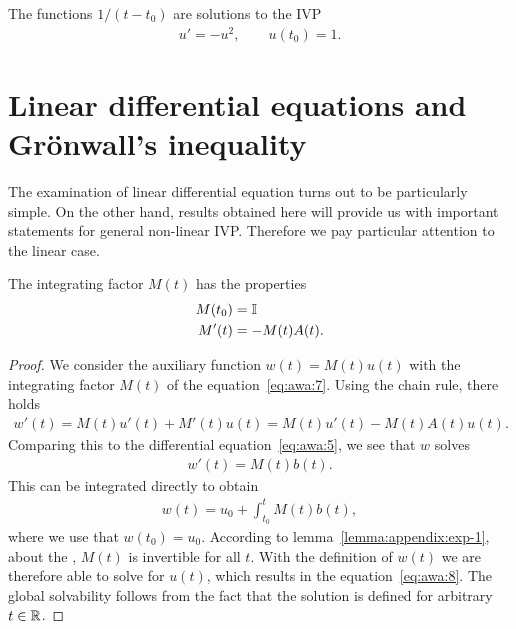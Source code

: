\begin{example}
  The functions $1/(t-t_0)$ are solutions to the IVP
  \begin{gather*}
    u'=-u^2, \qquad u(t_0) = 1.
  \end{gather*}
\end{example}

\section{Linear differential equations
  and Grönwall's inequality}

\begin{intro}
  The examination of linear differential equation turns out to be
  particularly simple. On the other hand, results obtained here will
  provide us with important statements for general non-linear
  IVP. Therefore we pay particular attention to the linear case.
\end{intro}




\begin{corollary}
  The integrating factor $M(t)$ has the properties
  \begin{align}
    \label{eq:awa:14}
    M(t_0) &= \mathbb I\\
    \label{eq:awa:15}
    M'(t) &= -M(t)A(t).
  \end{align}
\end{corollary}



\begin{proof}
  We consider the auxiliary function $w(t) = M(t) u(t)$ with the
  integrating factor $M(t)$ of the equation~\eqref{eq:awa:7}. Using the
  chain rule, there holds
  \begin{gather}
    \label{eq:awa:19}
    w'(t) =  M(t) u'(t) + M'(t) u(t)
    =  M(t) u'(t) - M(t)A(t)u(t).
  \end{gather}
  Comparing this to the differential equation~\eqref{eq:awa:5}, we see
  that $w$ solves
  \begin{gather*}
    w'(t) = M(t) b(t).
  \end{gather*}
	This can be integrated directly to obtain	
  \begin{gather*}
    w(t) = u_0 + \int_{t_0}^t M(t) b(t),
  \end{gather*}
  where we use that $w(t_0) = u_0$.  According to
  lemma~\ref{lemma:appendix:exp-1}, about the , $M(t)$ is invertible for all $t$.  With the
  definition of $w(t)$ we are therefore able to solve for $u(t)$,
  which results in the equation~\eqref{eq:awa:8}. The global
  solvability follows from the fact that the solution is defined for
  arbitrary $t\in \mathbb R$.
\end{proof}

